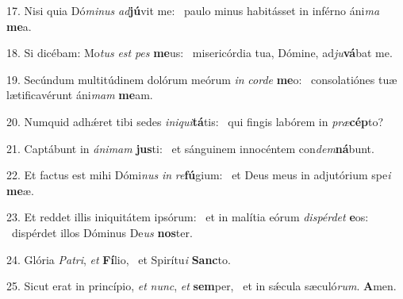17. Nisi quia Dó\textit{mi}\textit{nus} \textit{ad}\textbf{jú}vit me: \ast\  paulo minus habitásset in inférno áni\textit{ma} \textbf{me}a.\

18. Si dicébam: Mo\textit{tus} \textit{est} \textit{pes} \textbf{me}us: \ast\  misericórdia tua, Dómine, ad\textit{ju}\textbf{vá}bat me.\

19. Secúndum multitúdinem dolórum meórum \textit{in} \textit{cor}\textit{de} \textbf{me}o: \ast\  consolatiónes tuæ lætificavérunt áni\textit{mam} \textbf{me}am.\

20. Numquid adhǽret tibi sedes \textit{in}\textit{i}\textit{qui}\textbf{tá}tis: \ast\  qui fingis labórem in \textit{præ}\textbf{cép}to?\

21. Captábunt in \textit{á}\textit{ni}\textit{mam} \textbf{jus}ti: \ast\  et sánguinem innocéntem con\textit{dem}\textbf{ná}bunt.\

22. Et factus est mihi Dómi\textit{nus} \textit{in} \textit{re}\textbf{fú}gium: \ast\  et Deus meus in adjutórium spe\textit{i} \textbf{me}æ.\

23. Et reddet illis iniquitátem ipsórum: \dag\  et in malítia eórum \textit{dis}\textit{pér}\textit{det} \textbf{e}os: \ast\  dispérdet illos Dóminus De\textit{us} \textbf{nos}ter.\

24. Glória \textit{Pa}\textit{tri}, \textit{et} \textbf{Fí}lio, \ast\  et Spirítu\textit{i} \textbf{Sanc}to.\

25. Sicut erat in princípio, \textit{et} \textit{nunc}, \textit{et} \textbf{sem}per, \ast\  et in sǽcula sæculó\textit{rum}. \textbf{A}men.\

